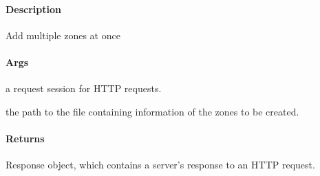 \documentclass[letterpaper,10pt,english]{sphinxmanual}
\begin{document}
\begin{fulllineitems}

\begin{fulllineitems}
\label{\detokenize{gemini_event_zone_API:gemini_event_zone_API.EventEndPoint.STATIC_INFO}}
\pysigstartsignatures
{}
\pysigstopsignatures
\end{fulllineitems}


\end{fulllineitems}


\begin{fulllineitems}
\label{\detokenize{gemini_event_zone_API:gemini_event_zone_API.add_event_zone_zones}}
\pysigstartsignatures
{}
\pysigstopsignatures

\paragraph{Description}
\label{\detokenize{gemini_event_zone_API:id1}}
\sphinxAtStartPar
Add multiple zones at once


\paragraph{Args}
\label{\detokenize{gemini_event_zone_API:args}}\begin{description}
\sphinxAtStartPar
a request session for HTTP requests.

\sphinxAtStartPar
the path to the file containing information of the zones to be created.

\end{description}


\paragraph{Returns}
\label{\detokenize{gemini_event_zone_API:returns}}\begin{description}
\sphinxAtStartPar
Response object, which contains a server’s response to an HTTP request.

\end{description}

\end{fulllineitems}
\end{document}
